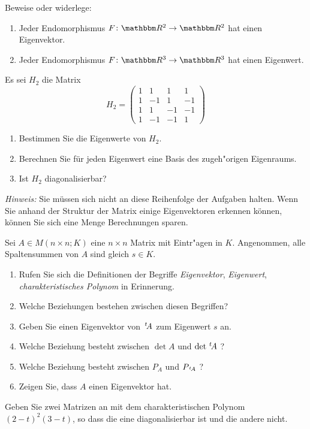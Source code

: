 \documentclass[a4,11pt]{article}
\begin{document}
\vspace*{-17mm}
{
\kopf
}


\begin{aufgabe}[4 Punkte]
  Beweise oder widerlege:
  \begin{enumerate}
  \item Jeder Endomorphismus $F \colon \R^2 \to \R^2$ hat einen
    Eigenvektor.
  \item Jeder Endomorphismus $F \colon \R^3 \to \R^3$ hat einen
    Eigenwert.
  \end{enumerate}
\end{aufgabe}

\begin{aufgabe}[4 Punkte]
Es sei $H_2$ die Matrix
\[
H_2 = \begin{pmatrix}
1 & 1 & 1 & 1\\
1 & -1 & 1 & -1\\
1 & 1 & -1 & -1\\
1 & -1 & -1 & 1
\end{pmatrix}
\]
\begin{enumerate}
\item Bestimmen Sie die Eigenwerte von $H_2$.
\item Berechnen Sie für jeden Eigenwert eine Basis des zugeh"origen Eigenraums.
\item Ist $H_2$ diagonalisierbar?
\end{enumerate}

\emph{Hinweis:} Sie müssen sich nicht an diese Reihenfolge der
Aufgaben halten. Wenn Sie anhand der Struktur der Matrix einige
Eigenvektoren erkennen können, können Sie sich eine Menge Berechnungen
sparen.
\end{aufgabe}

\begin{aufgabe}[4 Punkte]
Sei $A \in M(n \times n ; K)$ eine $n \times n$ Matrix mit Eintr"agen in $K$.
Angenommen, alle Spaltensummen von $A$ sind gleich $s \in K$.

\begin{enumerate}
\item Rufen Sie sich die Definitionen der Begriffe \emph{Eigenvektor},
  \emph{Eigenwert}, \emph{charakteristisches Polynom} in Erinnerung.
\item Welche Beziehungen bestehen zwischen diesen Begriffen?
\item Geben Sie einen Eigenvektor von $\,^t\!A$ zum Eigenwert $s$ an.
\item Welche Beziehung besteht zwischen $\det A$ und $\det \,^t\!A$ ?
\item Welche Beziehung besteht zwischen $P_A$ und $P_{\,^t\!A}$ ?
\item Zeigen Sie, dass $A$ einen Eigenvektor hat.
\end{enumerate}

\end{aufgabe}

\begin{aufgabe}[4 Punkte]
  Geben Sie zwei Matrizen an mit dem charakteristischen Polynom
  $(2-t)^2(3-t)$, so dass die eine diagonalisierbar ist und die andere
  nicht.
\end{aufgabe}
\end{document}
